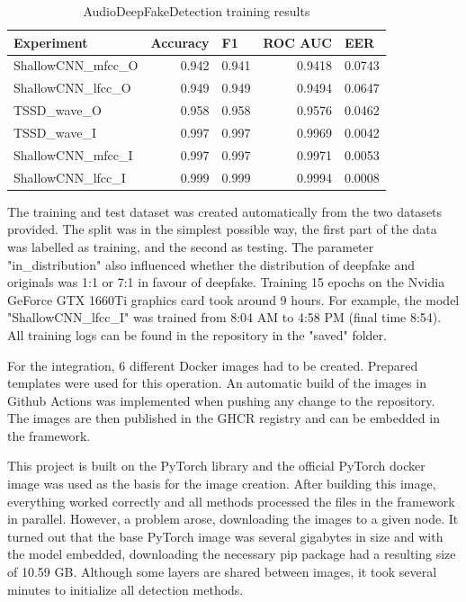 \begin{table}[H]
    \centering
    \begin{tabular}{|l|r|r|r|r|}
    \hline
    Experiment & \multicolumn{1}{l|}{Accuracy} & \multicolumn{1}{l|}{F1} & \multicolumn{1}{l|}{ROC AUC} & \multicolumn{1}{l|}{EER} \\ \hline
    ShallowCNN\_mfcc\_O & 0.942 & 0.941 & 0.9418 & 0.0743 \\ \hline
    ShallowCNN\_lfcc\_O & 0.949 & 0.949 & 0.9494 & 0.0647 \\ \hline
    TSSD\_wave\_O & 0.958 & 0.958 & 0.9576 & 0.0462 \\ \hline
    TSSD\_wave\_I & 0.997 & 0.997 & 0.9969 & 0.0042 \\ \hline
    ShallowCNN\_mfcc\_I & 0.997 & 0.997 & 0.9971 & 0.0053 \\ \hline
    ShallowCNN\_lfcc\_I & 0.999 & 0.999 & 0.9994 & 0.0008 \\ \hline
    \end{tabular}
    \caption{AudioDeepFakeDetection training results}
    \label{table:training_results}
\end{table}

The training and test dataset was created automatically from the two datasets provided. The split was in the simplest possible way, the first part of the data was labelled as training, and the second as testing. The parameter "in\_distribution" also influenced whether the distribution of deepfake and originals was 1:1 or 7:1 in favour of deepfake. Training 15 epochs on the Nvidia GeForce GTX 1660Ti graphics card took around 9 hours. For example, the model "ShallowCNN\_lfcc\_I" was trained from 8:04 AM to 4:58 PM (final time 8:54). All training logs can be found in the repository in the "saved" folder.

For the integration, 6 different Docker images had to be created. Prepared templates were used for this operation. An automatic build of the images in Github Actions was implemented when pushing any change to the repository. The images are then published in the GHCR registry and can be embedded in the framework.

This project is built on the PyTorch library and the official PyTorch docker image was used as the basis for the image creation. After building this image, everything worked correctly and all methods processed the files in the framework in parallel. However, a problem arose, downloading the images to a given node. It turned out that the base PyTorch image was several gigabytes in size and with the model embedded, downloading the necessary pip package had a resulting size of 10.59 GB. Although some layers are shared between images, it took several minutes to initialize all detection methods.

